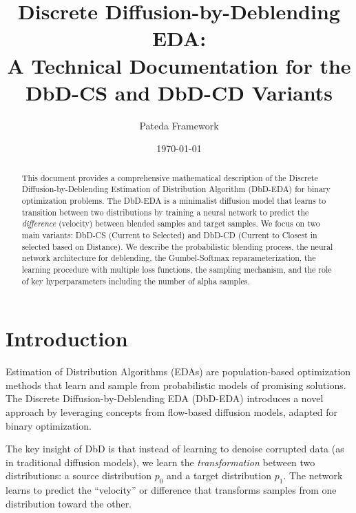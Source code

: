 \documentclass[11pt,a4paper]{article}
\title{Discrete Diffusion-by-Deblending EDA:\\
A Technical Documentation for the DbD-CS and DbD-CD Variants}
\author{Pateda Framework}
\date{\today}
\begin{document}
\maketitle

\begin{abstract}
This document provides a comprehensive mathematical description of the Discrete Diffusion-by-Deblending Estimation of Distribution Algorithm (DbD-EDA) for binary optimization problems. The DbD-EDA is a minimalist diffusion model that learns to transition between two distributions by training a neural network to predict the \emph{difference} (velocity) between blended samples and target samples. We focus on two main variants: DbD-CS (Current to Selected) and DbD-CD (Current to Closest in selected based on Distance). We describe the probabilistic blending process, the neural network architecture for deblending, the Gumbel-Softmax reparameterization, the learning procedure with multiple loss functions, the sampling mechanism, and the role of key hyperparameters including the number of alpha samples.
\end{abstract}

\tableofcontents
\newpage

\section{Introduction}

Estimation of Distribution Algorithms (EDAs) are population-based optimization methods that learn and sample from probabilistic models of promising solutions. The Discrete Diffusion-by-Deblending EDA (DbD-EDA) introduces a novel approach by leveraging concepts from flow-based diffusion models, adapted for binary optimization.

The key insight of DbD is that instead of learning to denoise corrupted data (as in traditional diffusion models), we learn the \emph{transformation} between two distributions: a source distribution $p_0$ and a target distribution $p_1$. The network learns to predict the ``velocity'' or difference that transforms samples from one distribution toward the other.
\end{document}
